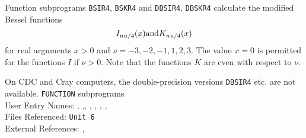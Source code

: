                         
                  
\Submitter{ }                           
                      
Function subprograms {\tt BSIR4}, {\tt BSKR4}
and {\tt DBSIR4}, {\tt DBSKR4}
calculate the modified Bessel functions
$$ I_{\nu/4}(x)\mbox{\quad and\quad}K_{\nu/4}(x)$$
for real arguments $x>0$
and $\nu=-3,-2,-1,1,2,3$. The value $x=0$
is permitted for the functions $I$ if $\nu > 0$.
Note that the functions $K$ are even with respect to $\nu$.
\par
On CDC and Cray computers, the double-precision versions
{\tt DBSIR4} etc. are not available.
\Structure
{\tt FUNCTION} subprograms \\
User Entry Names:
, ,, ,
, , , \\
Files Referenced: {\tt Unit 6} \\
External References: , 
 
